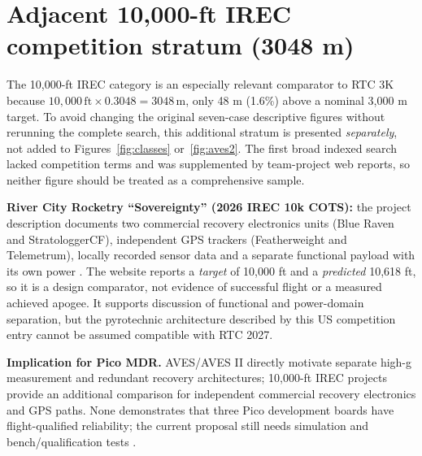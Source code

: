 \documentclass[10pt,a4paper]{article}
\begin{document}
\section{Adjacent 10,000-ft IREC competition stratum (3048 m)}
The 10,000-ft IREC category is an especially relevant comparator to RTC 3K because $10,000\,\mathrm{ft}\times0.3048=3048\,\mathrm{m}$, only 48 m (1.6\%) above a nominal 3,000 m target. To avoid changing the original seven-case descriptive figures without rerunning the complete search, this additional stratum is presented \emph{separately}, not added to Figures~\ref{fig:classes} or~\ref{fig:aves2}. The first broad indexed search lacked competition terms and was supplemented by team-project web reports, so neither figure should be treated as a comprehensive sample.

\textbf{River City Rocketry ``Sovereignty'' (2026 IREC 10k COTS):} the project description documents two commercial recovery electronics units (Blue Raven and StratologgerCF), independent GPS trackers (Featherweight and Telemetrum), locally recorded sensor data and a separate functional payload with its own power \cite{irec2026sovereignty}. The website reports a \emph{target} of 10,000 ft and a \emph{predicted} 10,618 ft, so it is a design comparator, not evidence of successful flight or a measured achieved apogee. It supports discussion of functional and power-domain separation, but the pyrotechnic architecture described by this US competition entry cannot be assumed compatible with RTC 2027.

\textbf{Implication for Pico MDR.} AVES/AVES II directly motivate separate high-g measurement and redundant recovery architectures; 10,000-ft IREC projects provide an additional comparison for independent commercial recovery electronics and GPS paths. None demonstrates that three Pico development boards have flight-qualified reliability; the current proposal still needs simulation and bench/qualification tests \cite{astg2021aves,astg2022aves2,irec2026sovereignty}.
\end{document}
